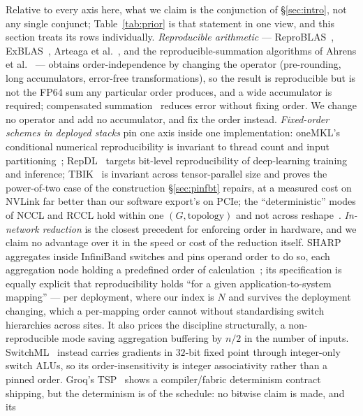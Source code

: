 \documentclass[journal,10pt]{IEEEtran}
\theoremstyle{plain}
\theoremstyle{definition}
\theoremstyle{remark}
\begin{document}
Relative to every axis here, what we claim is the conjunction of
\S\ref{sec:intro}, not any single conjunct; Table~\ref{tab:prior} is that
statement in one view, and this section treats its rows individually.
\emph{Reproducible arithmetic} --- ReproBLAS~\cite{demmel2013reproBLAS},
ExBLAS~\cite{iakymchuk2016exblas}, Arteaga et
al.~\cite{arteaga2014bitreproducible}, and the reproducible-summation
algorithms of Ahrens et al.~\cite{ahrens2020reproducible} --- obtains order-independence by
changing the operator (pre-rounding, long accumulators, error-free
transformations), so the result is reproducible but is not the FP64 sum any
particular order produces, and a wide accumulator is required; compensated
summation~\cite{kahan1965summation} reduces error without fixing order. We
change no operator and add no accumulator, and fix the order instead.
\emph{Fixed-order schemes in deployed stacks} pin one axis inside one
implementation: oneMKL's conditional numerical reproducibility is invariant to
thread count and input partitioning~\cite{onemkl_cnr}; RepDL~\cite{repdl2025} targets bit-level
reproducibility of deep-learning training and inference; TBIK~\cite{tbik2025} is
invariant across tensor-parallel size and proves the power-of-two case of the
construction \S\ref{sec:pinfbt} repairs, at a measured cost on NVLink far
better than our software export's on PCIe; the ``deterministic'' modes of NCCL
and RCCL hold within one $(G,\text{topology})$ and not across
reshape~\cite{nccl2018,rccl2019}. \emph{In-network reduction} is the closest
precedent for enforcing order in hardware, and we claim no advantage over it in
the speed or cost of the reduction itself. SHARP~\cite{graham2016scalable}
aggregates inside InfiniBand switches and pins operand order to do so, each
aggregation node holding a predefined order of
calculation~\cite{mellanox2019aggregation}; its specification is equally
explicit that reproducibility holds ``for a given application-to-system
mapping'' --- per deployment, where our index is $N$ and survives the
deployment changing, which a per-mapping order cannot without standardising
switch hierarchies across sites. It also prices the discipline structurally, a
non-reproducible mode saving aggregation buffering by $n/2$ in the number of
inputs. SwitchML~\cite{sapio2021scaling} instead carries gradients in $32$-bit
fixed point through integer-only switch ALUs, so its order-insensitivity is
integer associativity rather than a pinned order. Groq's
TSP~\cite{abts2022groq} shows a compiler/fabric determinism contract shipping,
but the determinism is of the schedule: no bitwise claim is made, and its
\end{document}
